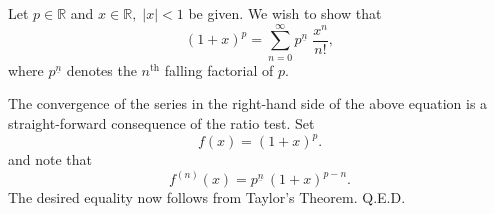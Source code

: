 \documentclass[12pt]{article}
\newcommand{\reals}{\mathbb{R}}
\newcommand{\supth}{^{\text{th}}}
\begin{document}
Let  $p\in \reals$ and $x\in\reals,\;|x|<1$ be given.  We wish to show
that 
$$(1+x)^p = \sum_{n=0}^\infty p^{\underline{n}}\; \frac{x^n}{n!},$$
where $p^{\underline{n}}$ denotes the $n\supth$ falling factorial of $p$.  

The convergence of the series in the right-hand side of the above
equation is a straight-forward consequence of the ratio test. Set 
$$f(x) = (1+x)^p.$$
and note that
$$f^{(n)}(x) = p^{\underline{n}}\, (1+x)^{p-n}.$$
The desired equality now follows from Taylor's Theorem. Q.E.D.
\end{document}
